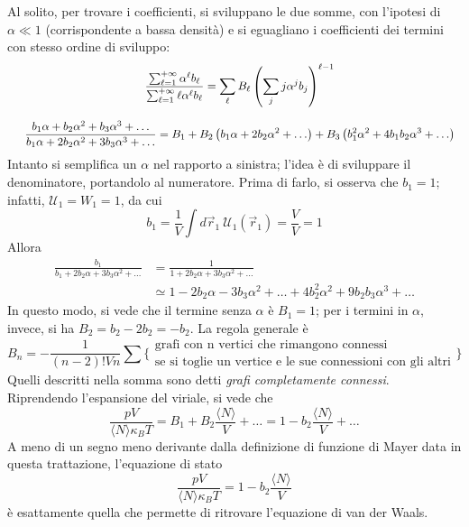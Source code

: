 \documentclass[11pt, a4paper]{scrartcl}
\theoremstyle{style}
\theoremstyle{style1}
\numberwithin{equation}{subsection}
\begin{document}
Al solito, per trovare i coefficienti, si sviluppano le due somme, con l'ipotesi di $\alpha \ll 1$ (corrispondente a bassa densit\`a) e si eguagliano i coefficienti dei termini con stesso ordine di sviluppo:
\[
	\begin{array}
		{c c}
		&\displaystyle \frac{\sum_{\ell =1}^{+\infty} \alpha ^\ell b_\ell }{\sum_{\ell =1}^{+\infty } \ell \alpha ^\ell b_\ell }=\sum_{\ell }^{} B_\ell \left(\sum_{j}^{} j \alpha ^j b_j\right) ^{\ell -1} \\
		\\
		& \displaystyle \frac{b_1 \alpha  + b_2 \alpha ^2 + b_3\alpha ^3 + \ldots}{b_1\alpha +2 b_2 \alpha ^2 + 3 b_3 \alpha ^3+\ldots} = B_1 +B_2 \left(b_1\alpha  + 2b_2 \alpha ^2+\ldots\right)  + B_3\left( b_1^2 \alpha ^2 + 4 b_1b_2 \alpha ^3 + \ldots \right) 
	\end{array}
\] 
Intanto si semplifica un $\alpha $ nel rapporto a sinistra; l'idea \`e di sviluppare il denominatore, portandolo al numeratore. 
Prima di farlo, si osserva che $b_1 = 1$; infatti, $\mathcal{U} _1 = W_1 = 1$, da cui
\[
b_1 = \frac{1}{V}\int d\vec{r}_1\ \mathcal{U} _1(\vec{r}_1) = \frac{V}{V} =1
\] 
Allora 
\[
	\begin{split}
		\frac{b_1}{b_1+2b_2\alpha +3b_3\alpha ^2+\ldots} &= \frac{1}{1+2b_2\alpha +3b_3\alpha ^2+\ldots} \\
								 &\simeq 1-2b_2\alpha - 3b_3\alpha ^2 + \ldots + 4b_2^2 \alpha ^2 + 9 b_2b_3\alpha ^3 +\ldots
	\end{split}
\] 
In questo modo, si vede che il termine senza $\alpha $ \`e $B_1 = 1$; per i termini in $\alpha $, invece, si ha $B_2 = b_2 - 2 b_2 = - b_2$.
La regola generale \`e 
\[
	B_n = -\frac{1}{(n-2)!Vn} \sum \Bigg\{\substack{\text{grafi con n vertici che rimangono connessi}\\ \text{se si toglie un vertice e le sue connessioni con gli altri}}\Bigg\}
\] 
Quelli descritti nella somma sono detti \textit{grafi completamente connessi}.
Riprendendo l'espansione del viriale, si vede che
\[
\frac{pV}{\langle N \rangle\kappa _B T}= B_1 + B_2 \frac{\langle N \rangle}{V} + \ldots = 1 - b_2 \frac{\langle N \rangle}{V}+\ldots
\] 
A meno di un segno meno derivante dalla definizione di funzione di Mayer data in questa trattazione, l'equazione di stato
\[
\frac{pV}{\langle N \rangle\kappa _B T} = 1 - b_2 \frac{\langle N \rangle}{V}
\] 
\`e esattamente quella che permette di ritrovare l'equazione di van der Waals.
\end{document}
